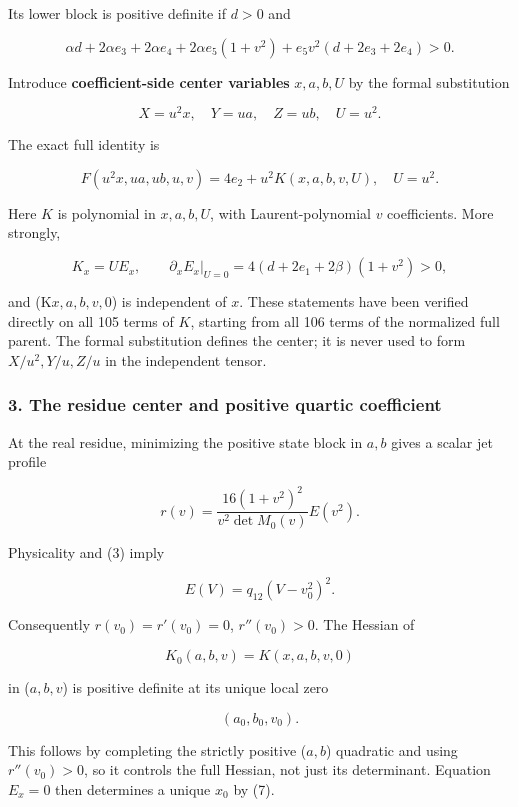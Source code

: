 Its lower block is positive definite if \(d>0\) and

\[
\alpha d+2\alpha e_3+2\alpha e_4+2\alpha e_5(1+v^2)
+e_5v^2(d+2e_3+2e_4)>0.
\]

Introduce \textbf{coefficient-side center variables} \(x,a,b,U\) by the formal
substitution

\[
X=u^2x,\quad Y=ua,\quad Z=ub,\quad U=u^2.
\]

The exact full identity is

\[
F(u^2x,ua,ub,u,v)=4e_2+u^2K(x,a,b,v,U),
\quad U=u^2.
\tag{6}
\]

Here \(K\) is polynomial in \(x,a,b,U\), with Laurent-polynomial \(v\)
coefficients. More strongly,

\[
K_x=U E_x,\qquad
\partial_x E_x\big|_{U=0}=4(d+2e_1+2\beta)(1+v^2)>0,
\tag{7}
\]

and (K\(x,a,b,v,0\)) is independent of \(x\). These statements have been
verified directly on all 105 terms of \(K\), starting from all 106 terms of
the normalized full parent. The formal substitution defines the center;
it is never used to form \(X/u^2,Y/u,Z/u\) in the independent tensor.

\hypertarget{the-residue-center-and-positive-quartic-coefficient}{%
\subsubsection*{3. The residue center and positive quartic coefficient}\label{p4ec1a51262f9:the-residue-center-and-positive-quartic-coefficient}}

At the real residue, minimizing the positive state block in \(a,b\) gives
a scalar jet profile

\[
r(v)=\frac{16(1+v^2)^2}{v^2\det M_0(v)}E(v^2).
\tag{8}
\]

Physicality and (3) imply

\[
E(V)=q_{12}(V-v_0^2)^2.
\]

Consequently \(r(v_0)=r'(v_0)=0\), \(r''(v_0)>0\). The Hessian of

\[
K_0(a,b,v)=K(x,a,b,v,0)
\]

in (\(a,b,v\)) is positive definite at its unique local zero

\[
(a_0,b_0,v_0).
\]

This follows by completing the strictly positive (\(a,b\)) quadratic and
using \(r''(v_0)>0\), so it controls the full Hessian, not just its
determinant. Equation \(E_x=0\) then determines a unique \(x_0\) by (7).

